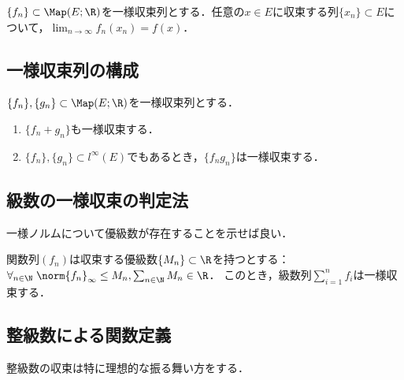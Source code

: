 \documentclass[uplatex, dvipdfmx]{jsreport}
\begin{document}
\begin{proposition}
    $\{f_n\}\subset\Map(E;\R)$を一様収束列とする．任意の$x\in E$に収束する列$\{x_n\}\subset E$について，$\lim_{n\to\infty}f_n(x_n)=f(x)$．
\end{proposition}

\subsection{一様収束列の構成}

\begin{proposition}
    $\{f_n\},\{g_n\}\subset\Map(E;\R)$を一様収束列とする．
    \begin{enumerate}
        \item $\{f_n+g_n\}$も一様収束する．
        \item $\{f_n\},\{g_n\}\subset l^\infty(E)$でもあるとき，$\{f_ng_n\}$は一様収束する．
    \end{enumerate}
\end{proposition}

\subsection{級数の一様収束の判定法}

\begin{tcolorbox}[colframe=ForestGreen, colback=ForestGreen!10!white,breakable,colbacktitle=ForestGreen!40!white,coltitle=black,fonttitle=\bfseries\sffamily,
title=]
    一様ノルムについて優級数が存在することを示せば良い．
\end{tcolorbox}

\begin{proposition}
    関数列$(f_n)$は収束する優級数$\{M_n\}\subset\R$を持つとする：$\forall_{n\in\N}\;\norm{f_n}_\infty\le M_n,\sum_{n\in\N}M_n\in\R$．
    このとき，級数列$\sum_{i=1}^nf_i$は一様収束する．
\end{proposition}

\subsection{整級数による関数定義}

\begin{tcolorbox}[colframe=ForestGreen, colback=ForestGreen!10!white,breakable,colbacktitle=ForestGreen!40!white,coltitle=black,fonttitle=\bfseries\sffamily,
title=]
    整級数の収束は特に理想的な振る舞い方をする．
\end{tcolorbox}
\end{document}
